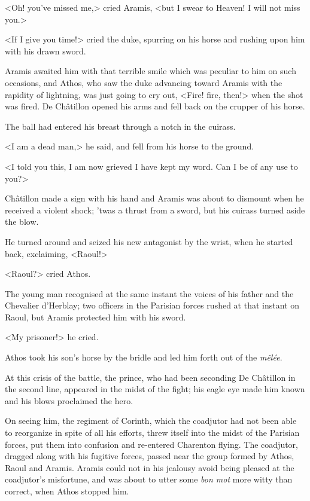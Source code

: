 <Oh! you've missed me,> cried Aramis, <but I swear to Heaven! I will not miss you.>

<If I give you time!> cried the duke, spurring on his horse and rushing upon him with his drawn sword.

Aramis awaited him with that terrible smile which was peculiar to him on such occasions, and Athos, who saw the duke advancing toward Aramis with the rapidity of lightning, was just going to cry out, <Fire! fire, then!> when the shot was fired. De Châtillon opened his arms and fell back on the crupper of his horse.

The ball had entered his breast through a notch in the cuirass.

<I am a dead man,> he said, and fell from his horse to the ground.

<I told you this, I am now grieved I have kept my word. Can I be of any use to you?>

Châtillon made a sign with his hand and Aramis was about to dismount when he received a violent shock; 'twas a thrust from a sword, but his cuirass turned aside the blow.

He turned around and seized his new antagonist by the wrist, when he started back, exclaiming, <Raoul!>

<Raoul?> cried Athos.

The young man recognised at the same instant the voices of his father and the Chevalier d'Herblay; two officers in the Parisian forces rushed at that instant on Raoul, but Aramis protected him with his sword.

<My prisoner!> he cried.

Athos took his son's horse by the bridle and led him forth out of the \textit{mêlée}.

At this crisis of the battle, the prince, who had been seconding De Châtillon in the second line, appeared in the midst of the fight; his eagle eye made him known and his blows proclaimed the hero.

On seeing him, the regiment of Corinth, which the coadjutor had not been able to reorganize in spite of all his efforts, threw itself into the midst of the Parisian forces, put them into confusion and re-entered Charenton flying. The coadjutor, dragged along with his fugitive forces, passed near the group formed by Athos, Raoul and Aramis. Aramis could not in his jealousy avoid being pleased at the coadjutor's misfortune, and was about to utter some \textit{bon mot} more witty than correct, when Athos stopped him.

